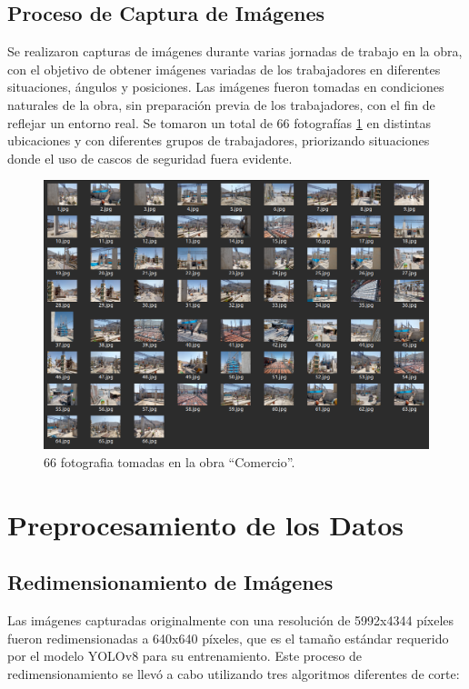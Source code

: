 \subsection{Proceso de Captura de Imágenes}

Se realizaron capturas de imágenes durante varias jornadas de trabajo en la obra, con el objetivo de obtener imágenes variadas de los trabajadores en diferentes situaciones, ángulos y posiciones. Las imágenes fueron tomadas en condiciones naturales de la obra, sin preparación previa de los trabajadores, con el fin de reflejar un entorno real. Se tomaron un total de 66 fotografías \ref{fig:photos} en distintas ubicaciones y con diferentes grupos de trabajadores, priorizando situaciones donde el uso de cascos de seguridad fuera evidente.

\begin{figure}[!ht]
  \centering
  \includegraphics[width=.49\linewidth]{images/photos.png}
  \caption{66 fotografia tomadas en la obra ``Comercio''.}
  \label{fig:photos}
\end{figure}

\section{Preprocesamiento de los Datos}

\subsection{Redimensionamiento de Imágenes}

Las imágenes capturadas originalmente con una resolución de 5992x4344 píxeles fueron redimensionadas a 640x640 píxeles, que es el tamaño estándar requerido por el modelo YOLOv8 para su entrenamiento. Este proceso de redimensionamiento se llevó a cabo utilizando tres algoritmos diferentes de corte:

